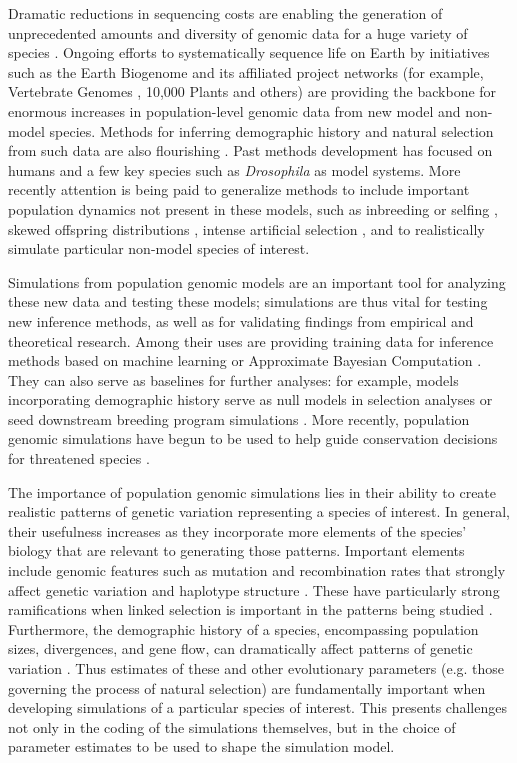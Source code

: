 \documentclass[hidelinks]{article}
\begin{document}
Dramatic reductions in sequencing costs are enabling the generation of
unprecedented amounts and diversity of genomic data for a huge variety of species
\citep{Ellegren2014}. Ongoing efforts to systematically sequence life on
Earth by initiatives such as the Earth Biogenome \citep{Lewin2022} and its
affiliated project networks (for example, Vertebrate Genomes
\citep{Rhie2021}, 10,000 Plants \citep{Cheng2018} and others) are
providing the backbone for enormous increases in population-level genomic data from
new model and non-model species. Methods for inferring
demographic history and natural selection from such data are also flourishing
\citep{Beichman2018}. Past methods development has
focused on humans and a few key species such as \emph{Drosophila}
as model systems. More recently attention is being paid to
generalize methods to include important population dynamics not present
in these models, such as inbreeding or selfing \citep{Blischak2020}, skewed offspring
distributions \citep{Montano2016}, intense artificial selection \citep{MacLeod2013,
MacLeod2014}, and to realistically simulate particular non-model species of interest.

Simulations from population genomic models are an important tool
for analyzing these new data and testing these models;
simulations are thus vital for testing new inference methods,
as well as for validating findings from empirical and theoretical research.
Among their uses are providing training
data for inference methods based on machine learning \citep{Schrider2018} or
Approximate Bayesian Computation \citep{Csillery2010}. They can also serve as
baselines for further analyses: for example, models incorporating
demographic history serve as null models in selection analyses
\citep{Hsieh2016a} or seed downstream breeding program simulations
\citep{Gaynor2020}. More recently, population genomic simulations have begun
to be used to help guide conservation decisions for threatened species
\citep{Teixeira2021}.

The importance of population genomic simulations lies in their ability
to create realistic patterns of genetic variation representing a species of interest.
In general, their usefulness increases 
as they incorporate more elements of the species' biology that are
relevant to generating those patterns. Important
elements include genomic features such as mutation and recombination
rates that strongly affect genetic variation and haplotype structure
\citep{Nachman2002}. These have particularly strong ramifications 
when linked selection is important in the patterns being studied \citep{Cutter2013}.
Furthermore, the demographic history of a
species, encompassing population sizes, divergences, and gene flow, can
dramatically affect patterns of genetic variation \citep{Teshima2006}. Thus
estimates of these and other evolutionary parameters (e.g. those governing
the process of natural selection) are fundamentally important when
developing simulations of a particular species of interest. This presents
challenges not only in the coding of the simulations themselves, but in
the choice of parameter estimates to be used to shape the simulation
model.
\end{document}
